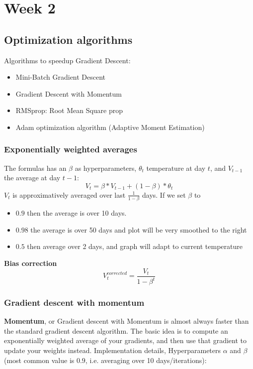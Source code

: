 \section*{Week 2}
\subsection*{Optimization algorithms}
Algorithms to speedup Gradient Descent:
\begin{itemize}
    \item Mini-Batch Gradient Descent
    \item Gradient Descent with Momentum
    \item RMSprop: Root Mean Square prop
    \item Adam optimization algorithm (Adaptive Moment Estimation)
\end{itemize}

\subsubsection*{Exponentially weighted averages}
The formulas has an $\beta$ as hyperparameters, $\theta_t$ temperature at day $t$, and $V_{t-1}$ the average at day $t-1$:
\begin{equation}
    V_t = \beta * V_{t-1} + (1 - \beta) * \theta_t
\end{equation}
$V_t$ is approximatively averaged over last $\frac{1}{1 - \beta}$ days. If we set $\beta$ to
\begin{itemize}
    \item $0.9$ then the average is over 10 days. 
    \item $0.98$ the average is over 50 days and plot will be very smoothed to the right
    \item $0.5$ then average over 2 days, and graph will adapt to current temperature
\end{itemize}
\textbf{Bias correction}
\begin{equation}
    V^{corrected}_t = \frac{V_t}{1 - \beta^t}
\end{equation}

\subsubsection*{Gradient descent with momentum}
\textbf{Momentum}, or Gradient descent with Momentum is almost always faster than the standard gradient descent algorithm. The basic idea is to compute an exponentially weighted average of your gradients, and then use that gradient to update your weights instead.
\newline
Implementation details, Hyperparameters $\alpha$ and $\beta$ (most common value is $0.9$, i.e. averaging over 10 days/iterations): 

